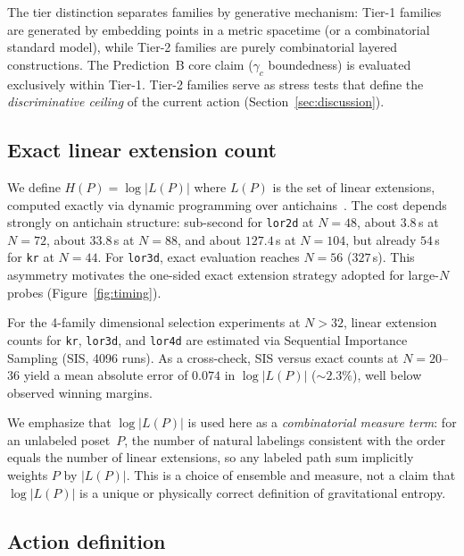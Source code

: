 \documentclass[12pt,a4paper]{article}
\begin{document}
The tier distinction separates families by generative mechanism:
Tier-1 families are generated by embedding points in a metric spacetime (or a
combinatorial standard model), while Tier-2 families are purely combinatorial
layered constructions. The Prediction~B core claim ($\gamma_c$ boundedness) is
evaluated exclusively within Tier-1. Tier-2 families serve as stress tests that
define the \emph{discriminative ceiling} of the current action
(Section~\ref{sec:discussion}).

\subsection{Exact linear extension count}
\label{sec:exact}

We define $H(P) = \log |L(P)|$ where $L(P)$ is the set of linear extensions,
computed exactly via dynamic programming over
antichains~\cite{brightwell1991}. The cost depends strongly on antichain
structure: sub-second for \texttt{lor2d} at $N = 48$, about $3.8$\,s at
$N = 72$, about $33.8$\,s at $N = 88$, and about $127.4$\,s at $N = 104$, but
already $54$\,s for \texttt{kr} at $N = 44$. For \texttt{lor3d}, exact
evaluation reaches $N = 56$ ($327$\,s). This asymmetry motivates the
one-sided exact extension strategy adopted for large-$N$ probes
(Figure~\ref{fig:timing}).

For the 4-family dimensional selection experiments at $N > 32$, linear extension
counts for \texttt{kr}, \texttt{lor3d}, and \texttt{lor4d} are estimated via
Sequential Importance Sampling (SIS, 4096 runs). As a cross-check, SIS versus
exact counts at $N = 20$--$36$ yield a mean absolute error of $0.074$ in
$\log|L(P)|$ ($\sim 2.3\%$), well below observed winning margins.

We emphasize that $\log|L(P)|$ is used here as a \emph{combinatorial measure term}: for an unlabeled poset~$P$, the number of natural labelings consistent with the order equals the number of linear extensions, so any labeled path sum implicitly weights $P$ by $|L(P)|$. This is a choice of ensemble and measure, not a claim that $\log|L(P)|$ is a unique or physically correct definition of gravitational entropy.

\subsection{Action definition}
\label{sec:action}
\end{document}
